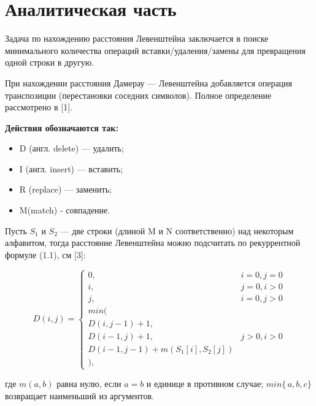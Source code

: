 \documentclass[12pt]{report}
\begin{document}
\chapter{Аналитическая часть}
Задача по нахождению расстояния Левенштейна заключается в поиске минимального количества операций вставки/удаления/замены для превращения одной строки в другую.

При нахождении расстояния Дамерау — Левенштейна добавляется операция транспозиции (перестановки соседних символов). Полное определение рассмотрено в [1].  
 
\textbf{Действия обозначаются так:} 
\begin{itemize}
  	\item D (англ. delete) — удалить;
	\item I (англ. insert) — вставить;
	\item R (replace) — заменить;
	\item M(match) - совпадение.
\end{itemize}

Пусть $S_{1}$ и $S_{2}$ — две строки (длиной M и N соответственно) над некоторым алфавитом, тогда расстояние Левенштейна можно подсчитать по рекуррентной формуле (1.1), см [3]:


\begin{equation}
D(i,j) = \left\{ \begin{array}{ll}
 0, & \textrm{$i = 0, j = 0$}\\
 i, & \textrm{$j = 0, i > 0$}\\
 j, & \textrm{$i = 0, j > 0$}\\
min(\\
D(i,j-1)+1,\\
D(i-1, j) +1, &\textrm{$j>0, i>0$}\\
D(i-1, j-1) + m(S_{1}[i], S_{2}[j])\\
),
\end{array} \right.
\end{equation}

где $m(a,b)$ равна нулю, если $a=b$ и единице в противном случае; $min\{\,a,b,c\}$ возвращает наименьший из аргументов.
\end{document}
